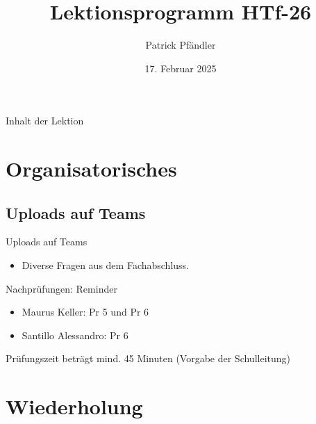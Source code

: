 \def\customoptions{aspectratio=169} %



\title{\textbf{Lektionsprogramm HTf-26}}
\author{Patrick Pfändler}
\date{17. Februar 2025}




\frame{\titlepage}

\begin{frame}{Inhalt der Lektion}
    \tableofcontents
\end{frame}

\folieFragen


\section{Organisatorisches}
\BlueSectionSlide

\subsection{Uploads auf Teams}
\begin{frame}{Uploads auf Teams}
    \begin{itemize}
        \item[\textbullet] Diverse Fragen aus dem Fachabschluss.
    \end{itemize}
\end{frame}



\begin{frame}{Nachprüfungen: Reminder}
    \begin{itemize}
        \item Maurus Keller: Pr 5 und Pr 6 
        \item Santillo	Alessandro: Pr 6
    \end{itemize}

    \vspace{\baselineskip}
    Prüfungszeit beträgt mind. 45 Minuten (Vorgabe der Schulleitung)

\end{frame}

\section{Wiederholung}
\BlueSectionSlide

